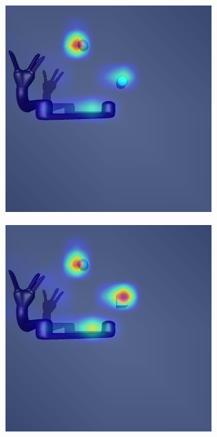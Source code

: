 \begin{figure}[h!]
\begin{subfigure}{0.24\columnwidth}
    \includegraphics[width=\linewidth]{figures/chapter6/distractor_saliency_jaco_pro_off/color_visual_std}
  \end{subfigure}
  \begin{subfigure}{0.24\columnwidth}
    \includegraphics[width=\linewidth]{figures/chapter6/distractor_saliency_jaco_pro_off/shape_visual_std}

\end{subfigure}
\end{figure}
